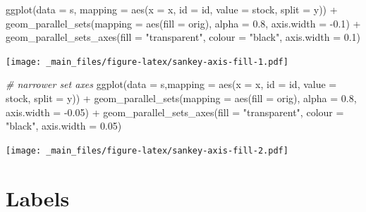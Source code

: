 \documentclass[
]{book}
\newenvironment{Shaded}{\begin{snugshade}}{\end{snugshade}}
\newcommand{\AttributeTok}[1]{\textcolor[rgb]{0.77,0.63,0.00}{#1}}
\newcommand{\CommentTok}[1]{\textcolor[rgb]{0.56,0.35,0.01}{\textit{#1}}}
\newcommand{\FloatTok}[1]{\textcolor[rgb]{0.00,0.00,0.81}{#1}}
\newcommand{\FunctionTok}[1]{\textcolor[rgb]{0.00,0.00,0.00}{#1}}
\newcommand{\NormalTok}[1]{#1}
\newcommand{\SpecialCharTok}[1]{\textcolor[rgb]{0.00,0.00,0.00}{#1}}
\newcommand{\StringTok}[1]{\textcolor[rgb]{0.31,0.60,0.02}{#1}}
\begin{document}
\begin{Shaded}
\begin{Highlighting}[]
\FunctionTok{ggplot}\NormalTok{(}\AttributeTok{data =}\NormalTok{ s, }\AttributeTok{mapping =} \FunctionTok{aes}\NormalTok{(}\AttributeTok{x =}\NormalTok{ x, }\AttributeTok{id =}\NormalTok{ id, }\AttributeTok{value =}\NormalTok{ stock, }\AttributeTok{split =}\NormalTok{ y)) }\SpecialCharTok{+}
  \FunctionTok{geom\_parallel\_sets}\NormalTok{(}\AttributeTok{mapping =} \FunctionTok{aes}\NormalTok{(}\AttributeTok{fill =}\NormalTok{ orig), }\AttributeTok{alpha =} \FloatTok{0.8}\NormalTok{, }\AttributeTok{axis.width =} \SpecialCharTok{{-}}\FloatTok{0.1}\NormalTok{) }\SpecialCharTok{+}
  \FunctionTok{geom\_parallel\_sets\_axes}\NormalTok{(}\AttributeTok{fill =} \StringTok{"transparent"}\NormalTok{, }\AttributeTok{colour =} \StringTok{"black"}\NormalTok{, }
                          \AttributeTok{axis.width =} \FloatTok{0.1}\NormalTok{)}
\end{Highlighting}
\end{Shaded}

\texttt{[image: \_main\_files/figure-latex/sankey-axis-fill-1.pdf]}

\begin{Shaded}
\begin{Highlighting}[]
\CommentTok{\# narrower set axes}
\FunctionTok{ggplot}\NormalTok{(}\AttributeTok{data =}\NormalTok{ s,}\AttributeTok{mapping =} \FunctionTok{aes}\NormalTok{(}\AttributeTok{x =}\NormalTok{ x, }\AttributeTok{id =}\NormalTok{ id, }\AttributeTok{value =}\NormalTok{ stock, }\AttributeTok{split =}\NormalTok{ y)) }\SpecialCharTok{+}
  \FunctionTok{geom\_parallel\_sets}\NormalTok{(}\AttributeTok{mapping =} \FunctionTok{aes}\NormalTok{(}\AttributeTok{fill =}\NormalTok{ orig), }\AttributeTok{alpha =} \FloatTok{0.8}\NormalTok{, }\AttributeTok{axis.width =} \SpecialCharTok{{-}}\FloatTok{0.05}\NormalTok{) }\SpecialCharTok{+}
  \FunctionTok{geom\_parallel\_sets\_axes}\NormalTok{(}\AttributeTok{fill =} \StringTok{"transparent"}\NormalTok{, }\AttributeTok{colour =} \StringTok{"black"}\NormalTok{, }
                          \AttributeTok{axis.width =} \FloatTok{0.05}\NormalTok{)}
\end{Highlighting}
\end{Shaded}

\texttt{[image: \_main\_files/figure-latex/sankey-axis-fill-2.pdf]}

\hypertarget{labels-6}{%
\section{Labels}\label{labels-6}}
\end{document}
